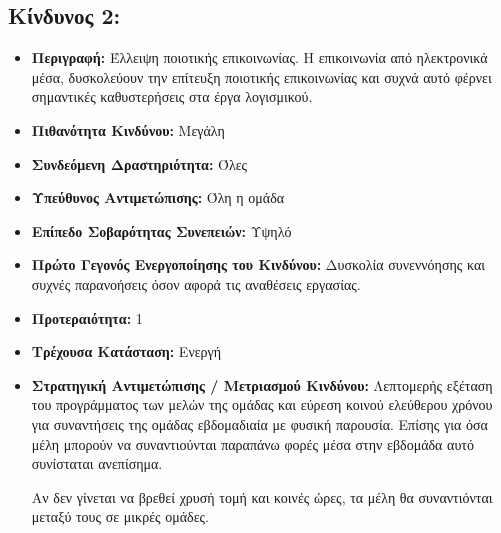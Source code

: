 \documentclass[12pt,a4paper]{article}
\begin{document}
\subsection*{Κίνδυνος 2:}
\begin{itemize}
	\item \textbf{Περιγραφή:} Έλλειψη ποιοτικής επικοινωνίας. Η επικοινωνία από ηλεκτρονικά μέσα, δυσκολεύουν την επίτευξη ποιοτικής επικοινωνίας και συχνά αυτό φέρνει σημαντικές καθυστερήσεις στα έργα λογισμικού.  
	\item \textbf{Πιθανότητα Κινδύνου:} Μεγάλη
	\item \textbf{Συνδεόμενη Δραστηριότητα:} Όλες
	\item \textbf{Υπεύθυνος Αντιμετώπισης:} Όλη η ομάδα
	\item \textbf{Επίπεδο Σοβαρότητας Συνεπειών:} Υψηλό
	\item \textbf{Πρώτο Γεγονός Ενεργοποίησης του Κινδύνου:} Δυσκολία συνεννόησης και συχνές παρανοήσεις όσον αφορά τις αναθέσεις εργασίας.
	\item \textbf{Προτεραιότητα:} 1
	\item \textbf{Τρέχουσα Κατάσταση:} Ενεργή
	\item \textbf{Στρατηγική Αντιμετώπισης / Μετριασμού Κινδύνου:} Λεπτομερής εξέταση του προγράμματος των μελών της ομάδας και εύρεση κοινού ελεύθερου χρόνου για συναντήσεις της ομάδας εβδομαδιαία με φυσική παρουσία. Επίσης για όσα μέλη μπορούν να συναντιούνται παραπάνω φορές μέσα στην εβδομάδα αυτό συνίσταται ανεπίσημα.

Αν δεν γίνεται να βρεθεί χρυσή τομή και κοινές ώρες, τα μέλη θα συναντιόνται μεταξύ τους σε μικρές ομάδες.
\end{itemize}
\end{document}
